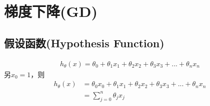 \section{梯度下降(GD)}
\subsection{假设函数(Hypothesis Function)}
\begin{equation}\begin{aligned}
	h_\theta(x) = \theta_0 + \theta_1x_1 + \theta_2x_2 + \theta_3x_3 + ... + \theta_nx_n
\end{aligned}\end{equation}
另$x_0=1$，则
\begin{equation}\begin{aligned}
	h_\theta(x) &= \theta_0x_0 + \theta_1x_1 + \theta_2x_2 + \theta_3x_3 + ... + \theta_nx_n \\
	&= \sum_{j=0}^n{\theta_jx_j}
\end{aligned}\end{equation}

